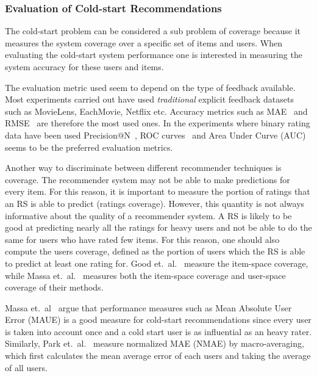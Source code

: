 
\subsubsection{Evaluation of Cold-start Recommendations}

The cold-start problem can be considered a sub problem of coverage because it
measures the system coverage over a specific set of items and users. When
evaluating the cold-start system performance one is interested in measuring the
system accuracy for these users and items.

The evaluation metric used seem to depend on the type of feedback available.
Most experiments carried out have used \emph{traditional} explicit feedback datasets such as
MovieLens, EachMovie, Netflix etc. Accuracy metrics such as MAE~\cite{Rashid2002, Rashid2008, Massa2004,
Massa2007, Stern2009} and RMSE~\cite{Agarwal2009, Agarwal2010} are therefore
the most used ones. In the experiments where binary rating data have been used
Precision@N~\cite{Liu2011, Gantner2010}, ROC curves~\cite{Agarwal2009,
Gantner2010, Schein2002} and Area Under Curve (AUC) \cite{Liu2011, Gantner2010} seems to be the
preferred evaluation metrics.

Another way to discriminate between different recommender techniques is
coverage. The recommender system may not be able to make predictions for every
item. For this reason, it is important to measure the portion of ratings that
an RS is able to predict (ratings coverage). However, this quantity is not
always informative about the quality of a recommender system. A RS is likely to
be good at predicting nearly all the ratings for heavy users and not be able to
do the same for users who have rated few items. For this reason, one should
also compute the users coverage, defined as the portion of users which the RS
is able to predict at least one rating for. Good et.\ al.~\cite{Good1999}
measure the item-space coverage, while Massa et.\ al.~\cite{Massa2004,
Massa2007} measures both the item-space coverage and user-space coverage of
their methods.

Massa et.\ al~\cite{Massa2004} argue that performance measures such as Mean
Absolute User Error (MAUE) is a good measure for cold-start recommendations
since every user is taken into account once and a cold start user is as
influential as an heavy rater. Similarly, Park et.\ al.~\cite{Park2006} measure
normalized MAE (NMAE) by macro-averaging, which first calculates the mean
average error of each users and taking the average of all users.

